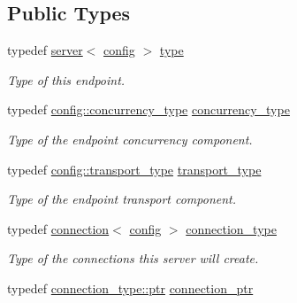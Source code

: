 \subsection*{Public Types}
\begin{DoxyCompactItemize}
\item 
typedef \hyperlink{classwebsocketpp_1_1server}{server}$<$ \hyperlink{classconfig}{config} $>$ \hyperlink{classwebsocketpp_1_1server_a265fd3d99141089206f0053c6b842790}{type}\hypertarget{classwebsocketpp_1_1server_a265fd3d99141089206f0053c6b842790}{}\label{classwebsocketpp_1_1server_a265fd3d99141089206f0053c6b842790}

\begin{DoxyCompactList}\small\item\em Type of this endpoint. \end{DoxyCompactList}\item 
typedef \hyperlink{classwebsocketpp_1_1concurrency_1_1none}{config\+::concurrency\+\_\+type} \hyperlink{classwebsocketpp_1_1server_ad389e3f96682b13a16f2bf01568eeabd}{concurrency\+\_\+type}\hypertarget{classwebsocketpp_1_1server_ad389e3f96682b13a16f2bf01568eeabd}{}\label{classwebsocketpp_1_1server_ad389e3f96682b13a16f2bf01568eeabd}

\begin{DoxyCompactList}\small\item\em Type of the endpoint concurrency component. \end{DoxyCompactList}\item 
typedef \hyperlink{classwebsocketpp_1_1transport_1_1asio_1_1endpoint}{config\+::transport\+\_\+type} \hyperlink{classwebsocketpp_1_1server_a762a51efebd0c0f87918f0369434f04f}{transport\+\_\+type}\hypertarget{classwebsocketpp_1_1server_a762a51efebd0c0f87918f0369434f04f}{}\label{classwebsocketpp_1_1server_a762a51efebd0c0f87918f0369434f04f}

\begin{DoxyCompactList}\small\item\em Type of the endpoint transport component. \end{DoxyCompactList}\item 
typedef \hyperlink{classwebsocketpp_1_1connection}{connection}$<$ \hyperlink{classconfig}{config} $>$ \hyperlink{classwebsocketpp_1_1server_a82d3d94b70a49b2073c9b3378ec7047c}{connection\+\_\+type}\hypertarget{classwebsocketpp_1_1server_a82d3d94b70a49b2073c9b3378ec7047c}{}\label{classwebsocketpp_1_1server_a82d3d94b70a49b2073c9b3378ec7047c}

\begin{DoxyCompactList}\small\item\em Type of the connections this server will create. \end{DoxyCompactList}\item 
typedef \hyperlink{classwebsocketpp_1_1connection_ab910d42e3bde91546183cc54642f32ab}{connection\+\_\+type\+::ptr} \hyperlink{classwebsocketpp_1_1server_a0b93f09ceae3d1dafd2f7b1da759c2ad}{connection\+\_\+ptr}\hypertarget{classwebsocketpp_1_1server_a0b93f09ceae3d1dafd2f7b1da759c2ad}{}\label{classwebsocketpp_1_1server_a0b93f09ceae3d1dafd2f7b1da759c2ad}


\end{DoxyCompactItemize}
